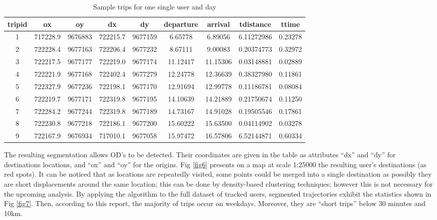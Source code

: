 \documentclass[runningheads]{llncs}
\begin{document}
\begin{table}

\caption{\label{tab:unnamed-chunk-4}\label{tab4}Sample trips for one single user and day}
\centering
\begin{tabular}[t]{c|c|c|c|c|c|c|c|c}
\hline
tripid & ox & oy & dx & dy & departure & arrival & tdistance & ttime\\
\hline
1 & 717228.9 & 9676883 & 722215.7 & 9677159 & 6.65778 & 6.89056 & 6.11272986 & 0.23278\\
\hline
2 & 722228.4 & 9677163 & 722206.4 & 9677232 & 8.67111 & 9.00083 & 0.20374773 & 0.32972\\
\hline
3 & 722217.5 & 9677177 & 722219.0 & 9677174 & 11.12417 & 11.15306 & 0.03148881 & 0.02889\\
\hline
4 & 722221.9 & 9677168 & 722402.4 & 9677279 & 12.24778 & 12.36639 & 0.38327980 & 0.11861\\
\hline
5 & 722327.9 & 9677236 & 722198.1 & 9677170 & 12.91694 & 12.99778 & 0.11186781 & 0.08084\\
\hline
6 & 722219.7 & 9677171 & 722319.8 & 9677195 & 14.10639 & 14.21889 & 0.21750674 & 0.11250\\
\hline
7 & 722284.2 & 9677244 & 722319.8 & 9677189 & 14.73167 & 14.91028 & 0.19505546 & 0.17861\\
\hline
8 & 722230.8 & 9677218 & 722186.1 & 9677200 & 15.60222 & 15.63500 & 0.04114902 & 0.03278\\
\hline
9 & 722167.9 & 9676934 & 717010.1 & 9677058 & 15.97472 & 16.57806 & 6.52144871 & 0.60334\\
\hline
\end{tabular}
\end{table}

The resulting segmentation allows OD's to be detected. Their coordinates are given in the table as attributes ``dx'' and ``dy'' for destinations locations, and ``ox'' and ``oy'' for the origins. Fig \ref{fig6} presents on a map at scale 1:25000 the resulting user's destinations (as red spots). It can be noticed that as locations are repeatedly visited, some points could be merged into a single destination as possibly they are short displacements around the same location; this can be done by density-based clustering techniques; however this is not necessary for the upcoming analysis. By applying the algorithm to the full dataset of tracked users, segmented trajectories exhibit the statistics shown in Fig \ref{fig7}. Then, according to this report, the majority of trips occur on weekdays. Moreover, they are ``short trips'' below 30 minutes and 10km.
\end{document}
